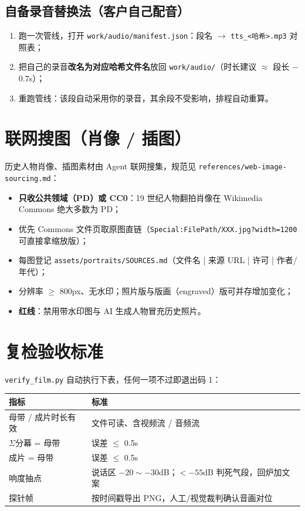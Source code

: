 \documentclass[12pt,a4paper]{ctexart}
\newcommand{\code}[1]{\texttt{\small #1}}
\begin{document}
\subsection{自备录音替换法（客户自己配音）}
\begin{enumerate}
    \item 跑一次管线，打开 \code{work/audio/manifest.json}：段名 $\to$ \code{tts\_<哈希>.mp3} 对照表；
    \item 把自己的录音\textbf{改名为对应哈希文件名}放回 \code{work/audio/}（时长建议 $\approx$ 段长 $-$ 0.7s）；
    \item 重跑管线：该段自动采用你的录音，其余段不受影响，排程自动重算。
\end{enumerate}

\section{联网搜图（肖像 / 插图）}

历史人物肖像、插图素材由 Agent 联网搜集，规范见 \code{references/web-image-sourcing.md}：
\begin{itemize}
    \item \textbf{只收公共领域（PD）或 CC0}：19 世纪人物翻拍肖像在 Wikimedia Commons 绝大多数为 PD；
    \item 优先 Commons 文件页取原图直链（\code{Special:FilePath/XXX.jpg?width=1200} 可直接拿缩放版）；
    \item 每图登记 \code{assets/portraits/SOURCES.md}（文件名 | 来源 URL | 许可 | 作者/年代）；
    \item 分辨率 $\geq$ 800px、无水印；照片版与版画（engraved）版可并存增加变化；
    \item \textbf{红线}：禁用带水印图与 AI 生成人物冒充历史照片。
\end{itemize}

\section{复检验收标准}

\code{verify\_film.py} 自动执行下表，任何一项不过即退出码 1：

\begin{center}
\begin{tabular}{p{5.2cm} p{8.6cm}}
\hline
\rowcolor{ptbg} 指标 & 标准 \\
\hline
母带 / 成片时长有效 & 文件可读、含视频流 / 音频流 \\
$\Sigma$分幕 = 母带 & 误差 $\leq$ 0.5s \\
成片 = 母带 & 误差 $\leq$ 0.5s \\
响度抽点 & 说话区 $-20\sim-30$dB；$<-55$dB 判死气段，回炉加文案 \\
探针帧 & 按时间戳导出 PNG，人工/视觉裁判确认音画对位 \\
\hline
\end{tabular}
\end{center}
\end{document}
